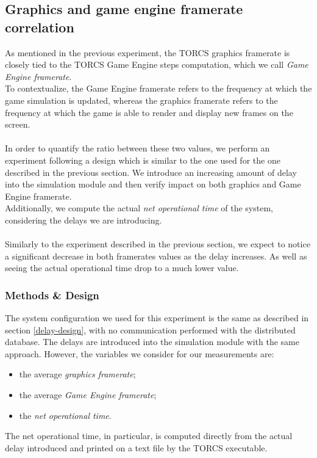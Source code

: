 \subsection{Graphics and game engine framerate correlation}
As mentioned in the previous experiment, the TORCS graphics framerate is closely tied to the TORCS Game Engine steps computation, which we call \textit{Game Engine framerate}. \\ 
To contextualize, the Game Engine framerate refers to the frequency at which the game simulation is updated, whereas the graphics framerate refers to the frequency at which the game is able to render and display new frames on the screen. \\ \\
In order to quantify the ratio between these two values, we perform an experiment following a design which is similar to the one used for the one described in the previous section. We introduce an increasing amount of delay into the simulation module and then verify impact on both graphics and Game Engine framerate. \\ Additionally, we compute the actual \textit{net operational time} of the system, considering the delays we are introducing. \\ \\
Similarly to the experiment described in the previous section, we expect to notice a significant decrease in both framerates values as the delay increases. As well as seeing the actual operational time drop to a much lower value.

\subsubsection{Methods \& Design}
The system configuration we used for this experiment is the same as described in section \ref{delay-design}, with no communication performed with the distributed database. The delays are introduced into the simulation module with the same approach. However, the variables we consider for our measurements are:
\begin{itemize}
	\item the average \textit{graphics framerate};
	\item the average \textit{Game Engine framerate};
	\item the \textit{net operational time}.
\end{itemize}
The net operational time, in particular, is computed directly from the actual delay introduced and printed on a text file by the TORCS executable.


